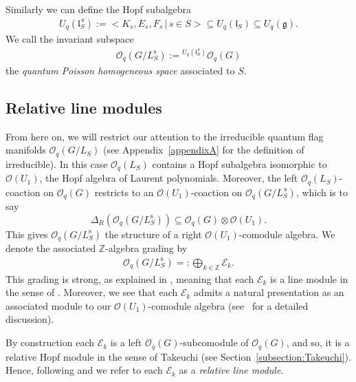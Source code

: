 \documentclass[10pt,a4paper]{amsart}
\numberwithin{equation}{section}
\newcommand{\usslevi}{U_q(\mathfrak{l}^{\,\mathrm{s}}_S)}
\begin{document}
Similarly we can define the Hopf subalgebra
\begin{align*}
\usslevi := \big< K_s, E_s, F_s \,|\, s \in S \big> \subseteq U_q(\mathfrak{l}_S) \subseteq U_q(\mathfrak{g}).
\end{align*}
We call the invariant subspace
\begin{align*}
\mathcal{O}_q(G/L^{\mathrm{s}}_S):= {}^{U_q(\mathfrak{l}^{\,\mathrm{s}}_S)} \mathcal{O}_q(G)
\end{align*}
the \emph{quantum Poisson homogeneous space} associated to $S$.

\subsection{Relative line modules}\label{section2.6}

From here on, we will restrict our attention to the irreducible quantum flag manifolds $\mathcal{O}_q(G/L_S)$ (see Appendix~\ref{appendixA} for the definition of irreducible). In this case $\mathcal{O}_q(L_S)$ contains a Hopf subalgebra isomorphic to $\mathcal{O}(U_1)$, the Hopf algebra of Laurent polynomials.
Moreover, the left $\mathcal{O}_q(L_S)$-coaction on $\mathcal{O}_q(G)$ restricts to an $\mathcal{O}(U_1)$-coaction on $\mathcal{O}_q(G/L^{\,\mathrm{s}}_S)$, which is to say
\[
\Delta_{R}(\mathcal{O}_q(G/L^{\mathrm{s}}_S)) \subseteq \mathcal{O}_q(G) \otimes \mathcal{O}(U_1).
\]
This gives $\mathcal{O}_q(G/L^{\mathrm{s}}_S)$ the structure of a right $\mathcal{O}(U_1)$-comodule algebra. We denote the associated $\mathbb{Z}$-algebra grading by
\begin{gather}\label{eqn:linebundeldecomp}
\mathcal{O}_q(G/L^{\mathrm{s}}_S) =: \bigoplus_{k\in \mathbb{Z}} \mathcal{E}_k.
\end{gather}
This grading is strong, as explained in \cite[Section~4]{GAPP}, meaning that each $\mathcal{E}_k$ is a line module in the sense of \cite[Section~3.5]{BeggsMajid:Leabh}. Moreover, we see that each $\mathcal{E}_k$ admits a natural presentation as an associated module to our $\mathcal{O}(U_1)$-comodule algebra (see~\cite[Section~5]{GAPP} for a detailed discussion).

By construction each $\mathcal{E}_k$ is a left $\mathcal{O}_q(G)$-subcomodule of $\mathcal{O}_q(G)$, and so, it is a relative Hopf module in the sense of Takeuchi (see Section~\ref{subsection:Takeuchi}). Hence, following \cite[Section~3.1]{DOKSS} and \cite[Section~2.3]{GAPP} we refer to each $\mathcal{E}_k$ as a \emph{relative line module}.
\end{document}
